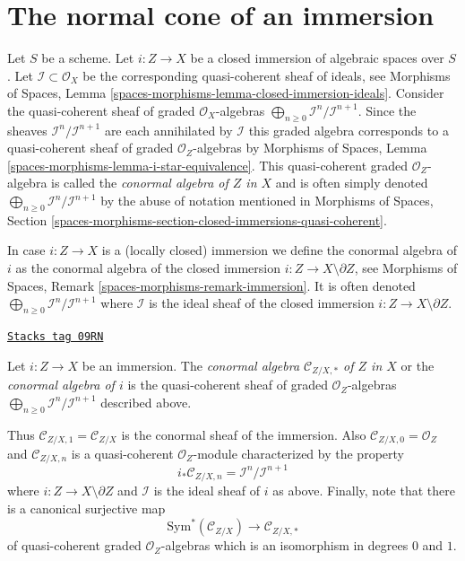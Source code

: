 \section{The normal cone of an immersion}
\label{spaces-more-morphisms-section-normal-cone}
Let $S$ be a scheme. Let $i : Z \to X$ be a closed immersion of algebraic
spaces over $S$. Let $\mathcal{I} \subset \mathcal{O}_X$ be the
corresponding quasi-coherent sheaf of ideals, see
Morphisms of Spaces, Lemma
\ref{spaces-morphisms-lemma-closed-immersion-ideals}.
Consider the quasi-coherent sheaf of graded $\mathcal{O}_X$-algebras
$\bigoplus_{n \geq 0} \mathcal{I}^n/\mathcal{I}^{n + 1}$.
Since the sheaves $\mathcal{I}^n/\mathcal{I}^{n + 1}$
are each annihilated by $\mathcal{I}$ this graded algebra
corresponds to a quasi-coherent sheaf of graded $\mathcal{O}_Z$-algebras by
Morphisms of Spaces, Lemma \ref{spaces-morphisms-lemma-i-star-equivalence}.
This quasi-coherent graded $\mathcal{O}_Z$-algebra is called the
{\it conormal algebra of $Z$ in $X$} and is often simply denoted
$\bigoplus_{n \geq 0} \mathcal{I}^n/\mathcal{I}^{n + 1}$
by the abuse of notation mentioned in
Morphisms of Spaces, Section
\ref{spaces-morphisms-section-closed-immersions-quasi-coherent}.

\medskip\noindent
In case $i : Z \to X$ is a (locally closed) immersion we define the conormal
algebra of $i$ as the conormal algebra of the closed immersion
$i : Z \to X \setminus \partial Z$, see Morphisms of Spaces, Remark
\ref{spaces-morphisms-remark-immersion}.
It is often denoted
$\bigoplus_{n \geq 0} \mathcal{I}^n/\mathcal{I}^{n + 1}$
where $\mathcal{I}$ is the ideal sheaf
of the closed immersion $i : Z \to X \setminus \partial Z$.

\begin{definition}
\label{spaces-more-morphisms-definition-conormal-algebra}
\href{https://stacks.math.columbia.edu/tag/09RN}{\texttt{Stacks tag 09RN}}

Let $i : Z \to X$ be an immersion. The {\it conormal algebra
$\mathcal{C}_{Z/X, *}$ of $Z$ in $X$} or the {\it conormal algebra of $i$}
is the quasi-coherent sheaf of graded $\mathcal{O}_Z$-algebras
$\bigoplus_{n \geq 0} \mathcal{I}^n/\mathcal{I}^{n + 1}$ described above.
\end{definition}

Thus $\mathcal{C}_{Z/X, 1} = \mathcal{C}_{Z/X}$ is the conormal sheaf
of the immersion. Also $\mathcal{C}_{Z/X, 0} = \mathcal{O}_Z$ and
$\mathcal{C}_{Z/X, n}$ is a quasi-coherent $\mathcal{O}_Z$-module
characterized by the property
\begin{equation}
\label{equation-conormal-in-degree-n}
i_*\mathcal{C}_{Z/X, n} = \mathcal{I}^n/\mathcal{I}^{n + 1}
\end{equation}
where $i : Z \to X \setminus \partial Z$ and $\mathcal{I}$ is the ideal
sheaf of $i$ as above. Finally, note that there is a canonical surjective map
\begin{equation}
\label{equation-conormal-algebra-quotient}
\text{Sym}^*(\mathcal{C}_{Z/X}) \longrightarrow \mathcal{C}_{Z/X, *}
\end{equation}
of quasi-coherent graded $\mathcal{O}_Z$-algebras which is an isomorphism
in degrees $0$ and $1$.

